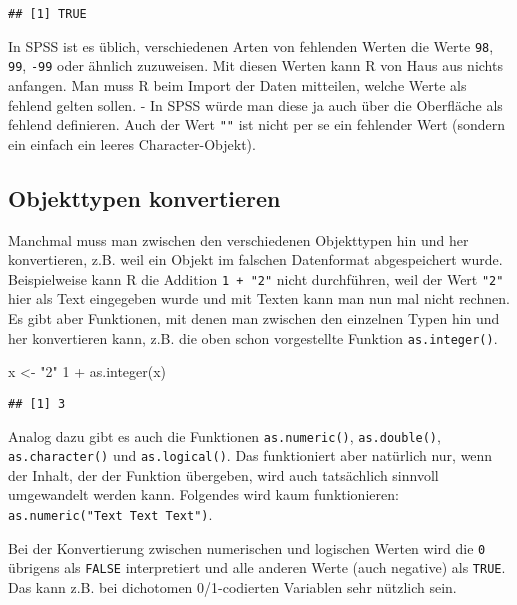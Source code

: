 \documentclass[
]{book}
\newenvironment{Shaded}{\begin{snugshade}}{\end{snugshade}}
\newcommand{\DecValTok}[1]{\textcolor[rgb]{0.00,0.00,0.81}{#1}}
\newcommand{\FunctionTok}[1]{\textcolor[rgb]{0.00,0.00,0.00}{#1}}
\newcommand{\NormalTok}[1]{#1}
\newcommand{\OtherTok}[1]{\textcolor[rgb]{0.56,0.35,0.01}{#1}}
\newcommand{\SpecialCharTok}[1]{\textcolor[rgb]{0.00,0.00,0.00}{#1}}
\newcommand{\StringTok}[1]{\textcolor[rgb]{0.31,0.60,0.02}{#1}}
\begin{document}
\begin{verbatim}
## [1] TRUE
\end{verbatim}

In SPSS ist es üblich, verschiedenen Arten von fehlenden Werten die Werte \texttt{98}, \texttt{99}, \texttt{-99} oder ähnlich zuzuweisen. Mit diesen Werten kann R von Haus aus nichts anfangen. Man muss R beim Import der Daten mitteilen, welche Werte als fehlend gelten sollen. - In SPSS würde man diese ja auch über die Oberfläche als fehlend definieren. Auch der Wert \texttt{""} ist nicht per se ein fehlender Wert (sondern ein einfach ein leeres Character-Objekt).

\hypertarget{objekttypen-konvertieren}{%
\subsection{Objekttypen konvertieren}\label{objekttypen-konvertieren}}

Manchmal muss man zwischen den verschiedenen Objekttypen hin und her konvertieren, z.B. weil ein Objekt im falschen Datenformat abgespeichert wurde. Beispielweise kann R die Addition \texttt{1\ +\ "2"} nicht durchführen, weil der Wert \texttt{"2"} hier als Text eingegeben wurde und mit Texten kann man nun mal nicht rechnen. Es gibt aber Funktionen, mit denen man zwischen den einzelnen Typen hin und her konvertieren kann, z.B. die oben schon vorgestellte Funktion \texttt{as.integer()}.

\begin{Shaded}
\begin{Highlighting}[]
\NormalTok{x }\OtherTok{\textless{}{-}} \StringTok{"2"}
\DecValTok{1} \SpecialCharTok{+} \FunctionTok{as.integer}\NormalTok{(x)}
\end{Highlighting}
\end{Shaded}

\begin{verbatim}
## [1] 3
\end{verbatim}

Analog dazu gibt es auch die Funktionen \texttt{as.numeric()}, \texttt{as.double()}, \texttt{as.character()} und \texttt{as.logical()}. Das funktioniert aber natürlich nur, wenn der Inhalt, der der Funktion übergeben, wird auch tatsächlich sinnvoll umgewandelt werden kann. Folgendes wird kaum funktionieren: \texttt{as.numeric("Text\ Text\ Text")}.

Bei der Konvertierung zwischen numerischen und logischen Werten wird die \texttt{0} übrigens als \texttt{FALSE} interpretiert und alle anderen Werte (auch negative) als \texttt{TRUE}. Das kann z.B. bei dichotomen 0/1-codierten Variablen sehr nützlich sein.
\end{document}
